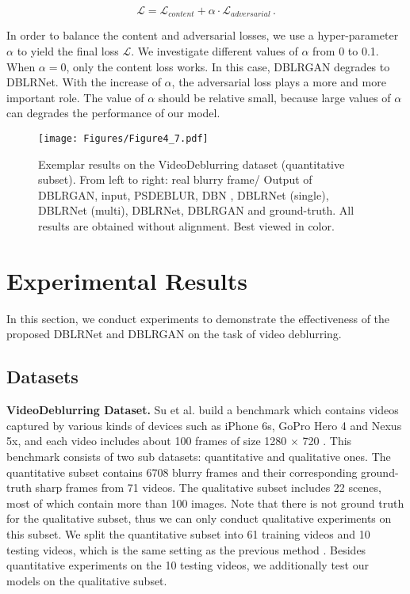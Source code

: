 \documentclass[journal]{IEEEtran}
\begin{document}
\begin{equation}
\mathcal{L} = \mathcal{L}_{content} + \alpha \cdot \mathcal{L}_{adversarial} \, .
\end{equation}

In order to balance the content and adversarial losses, we use a hyper-parameter  $\alpha$ to yield the final loss $\mathcal{L}$. We investigate different values of $\alpha$ from 0 to 0.1. When $\alpha=0$, only the content loss works. In this case, DBLRGAN degrades to DBLRNet. With the increase of $\alpha$, the adversarial loss plays a more and more important role. The value of $\alpha$ should be relative small, because large values of $\alpha$ can degrades the performance of our model.

\begin{figure*}[ht] 
	\centering
	\texttt{[image: Figures/Figure4\_7.pdf]}
	\caption{Exemplar results on the VideoDeblurring dataset (quantitative subset). From left to right: real blurry frame/ Output of DBLRGAN, input, PSDEBLUR, DBN \cite{su2016deep}, DBLRNet (single), DBLRNet (multi), DBLRNet, DBLRGAN and ground-truth. All results are obtained without alignment. Best viewed in color.}
	\label{figure4}
\end{figure*}

\section{Experimental Results}
\noindent In this section, we conduct experiments to demonstrate the effectiveness of the proposed DBLRNet and DBLRGAN on the task of video deblurring.

\subsection{Datasets}

\textbf{VideoDeblurring Dataset.} Su et al. build a benchmark which contains videos captured by various kinds of devices such as iPhone 6s, GoPro Hero 4 and Nexus 5x, and each video includes about 100 frames of size 1280 $\times$ 720 \cite{su2016deep}. This benchmark consists of two sub datasets: quantitative and qualitative ones. The quantitative subset contains 6708 blurry frames and their corresponding ground-truth sharp frames from 71 videos. The qualitative subset includes 22 scenes, most of which contain more than 100 images. Note that there is not ground truth for the qualitative subset, thus we can only conduct qualitative experiments on this subset. We split the quantitative subset into 61 training videos and 10 testing videos, which is the same setting as the previous method \cite{su2016deep}. Besides quantitative experiments on the 10 testing videos, we additionally test our models on the qualitative subset.
\end{document}
